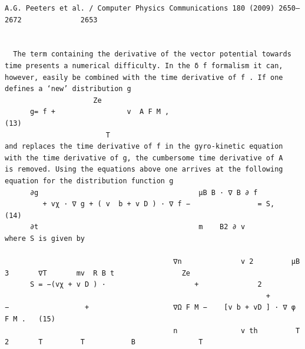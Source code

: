 \documentclass[a4paper]{article}
\newcommand{\gkwpagefont}{\fontsize{6.0pt}{7.55pt}\selectfont}
\begin{document}
\begin{Verbatim}[fontsize=\gkwpagefont]
                                                                 A.G. Peeters et al. / Computer Physics Communications 180 (2009) 2650–2672              2653


  The term containing the derivative of the vector potential towards time presents a numerical difficulty. In the δ f formalism it can,
however, easily be combined with the time derivative of f . If one defines a ‘new’ distribution g
                     Ze
      g= f +                 v  A F M ,                                                                                                                (13)
                        T
and replaces the time derivative of f in the gyro-kinetic equation with the time derivative of g, the cumbersome time derivative of A 
is removed. Using the equations above one arrives at the following equation for the distribution function g
      ∂g                                      μB B · ∇ B ∂ f
         + vχ · ∇ g + ( v  b + v D ) · ∇ f −                = S,                                                                                        (14)
      ∂t                                      m    B2 ∂ v
where S is given by
                                                                                                                 
                                        ∇n              v 2         μB         3       ∇T       mv  R B t                Ze
      S = −(vχ + v D ) ·                     +              2
                                                              +           −                  +                    ∇Ω F M −    [v b + vD ] · ∇ φ F M .   (15)
                                        n               v th         T          2       T         T           B               T


\end{Verbatim}
\end{document}
